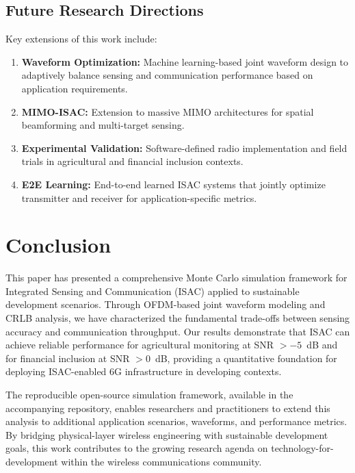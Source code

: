 \documentclass[conference]{IEEEtran}
\begin{document}
\subsection{Future Research Directions}

Key extensions of this work include:

\begin{enumerate}
    \item \textbf{Waveform Optimization:} Machine learning-based joint waveform design to adaptively balance sensing and communication performance based on application requirements.
    \item \textbf{MIMO-ISAC:} Extension to massive MIMO architectures for spatial beamforming and multi-target sensing.
    \item \textbf{Experimental Validation:} Software-defined radio implementation and field trials in agricultural and financial inclusion contexts.
    \item \textbf{E2E Learning:} End-to-end learned ISAC systems that jointly optimize transmitter and receiver for application-specific metrics.
\end{enumerate}

\section{Conclusion}

This paper has presented a comprehensive Monte Carlo simulation framework for Integrated Sensing and Communication (ISAC) applied to sustainable development scenarios. Through OFDM-based joint waveform modeling and CRLB analysis, we have characterized the fundamental trade-offs between sensing accuracy and communication throughput. Our results demonstrate that ISAC can achieve reliable performance for agricultural monitoring at SNR $>-5$~dB and for financial inclusion at SNR $>0$~dB, providing a quantitative foundation for deploying ISAC-enabled 6G infrastructure in developing contexts.

The reproducible open-source simulation framework, available in the accompanying repository, enables researchers and practitioners to extend this analysis to additional application scenarios, waveforms, and performance metrics. By bridging physical-layer wireless engineering with sustainable development goals, this work contributes to the growing research agenda on technology-for-development within the wireless communications community.
\end{document}

